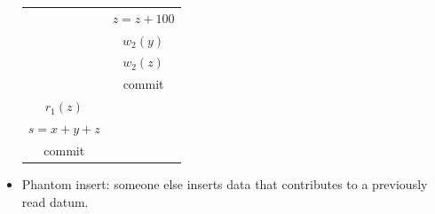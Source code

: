\documentclass[12pt, a4paper]{report}
\begin{document}
\begin{itemize}
\begin{table}[H]
\begin{tabular}{c|c}
                                           & $z=z+100$                  \\
                                           & $w_2(y)$                   \\
                                           & $w_2(z)$                   \\
                                           & commit                     \\
                $r_1(z)$                   &                            \\
                $s=x+y+z$                  &                            \\
                commit                     &                           
                \end{tabular}
            \end{table}
        \item Phantom insert: someone else inserts data that contributes to a previously read datum.
    \end{itemize}
\end{document}

